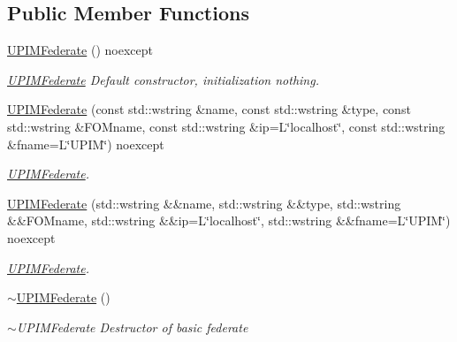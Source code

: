 \subsection*{Public Member Functions}
\begin{DoxyCompactItemize}
\item 
\mbox{\label{classUPIM_1_1UPIMFederate_a5c409f0c1aad65fb9c5a6d142a6ff9d8}} 
\hyperlink{classUPIM_1_1UPIMFederate_a5c409f0c1aad65fb9c5a6d142a6ff9d8}{U\+P\+I\+M\+Federate} () noexcept
\begin{DoxyCompactList}\small\item\em \hyperlink{classUPIM_1_1UPIMFederate}{U\+P\+I\+M\+Federate} Default constructor, initialization nothing. \end{DoxyCompactList}\item 
\hyperlink{classUPIM_1_1UPIMFederate_a07d3d21558b527bb708f833fd28c1146}{U\+P\+I\+M\+Federate} (const std\+::wstring \&name, const std\+::wstring \&type, const std\+::wstring \&F\+O\+Mname, const std\+::wstring \&ip=L\char`\"{}localhost\char`\"{}, const std\+::wstring \&fname=L\char`\"{}U\+P\+IM\char`\"{}) noexcept
\begin{DoxyCompactList}\small\item\em \hyperlink{classUPIM_1_1UPIMFederate}{U\+P\+I\+M\+Federate}. \end{DoxyCompactList}\item 
\hyperlink{classUPIM_1_1UPIMFederate_a8f7890d9793640d27ce87b9f98f804c9}{U\+P\+I\+M\+Federate} (std\+::wstring \&\&name, std\+::wstring \&\&type, std\+::wstring \&\&F\+O\+Mname, std\+::wstring \&\&ip=L\char`\"{}localhost\char`\"{}, std\+::wstring \&\&fname=L\char`\"{}U\+P\+IM\char`\"{}) noexcept
\begin{DoxyCompactList}\small\item\em \hyperlink{classUPIM_1_1UPIMFederate}{U\+P\+I\+M\+Federate}. \end{DoxyCompactList}\item 
\mbox{\label{classUPIM_1_1UPIMFederate_ab8a82f9b3cc49a09a980b7c455666fa8}} 
\hyperlink{classUPIM_1_1UPIMFederate_ab8a82f9b3cc49a09a980b7c455666fa8}{$\sim$\+U\+P\+I\+M\+Federate} ()
\begin{DoxyCompactList}\small\item\em $\sim$\+U\+P\+I\+M\+Federate Destructor of basic federate \end{DoxyCompactList}\item 

\end{DoxyCompactItemize}
